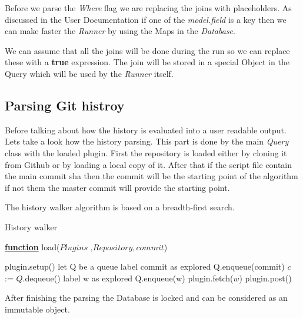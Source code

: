 Before we parse the \textit{Where} flag we are replacing the joins with placeholders.
As discussed in the User Documentation if one of the \textit{model.field} is a key then
we can make faster the \textit{Runner} by using the Maps in the \textit{Database}.

We can assume that all the joins will be done during the run so we can replace these with a
\textbf{true} expression. The join will be stored in a special Object in the Query which will
be used by the \textit{Runner} itself.

\subsection{Parsing Git histroy}

Before talking about how the history is evaluated into a user readable output. Lets take a look
how the history parsing. This part is done by the main \textit{Query} class with the loaded
plugin. First the repository is loaded either by cloning it from Github or by loading a local copy of it. After that if the script file contain the main commit sha then the commit will be the starting point of the algorithm if not them the master commit will provide the starting point.

The history walker algorithm is based on a breadth-first search.

\begin{algorithm}[H]
	\caption{History walker} 
	\label{alg:ibb} 
	\textbf{\underline{function}} load($Plugins$ ,$Repository, commit$)
	\begin{algorithmic}[1] %
		\State plugin.setup()
		\EndFor
		\State let Q be a queue
		\State label commit as explored
		\State Q.enqueue(commit)
		\State $c$ := $Q$.dequeue()
		\State label w as explored  
		\State Q.enqueue(w) 
		\State plugin.fetch($w$)
		\EndFor 
		\EndIf
		\EndFor
		\EndWhile
		\State plugin.post()
		\EndFor
		\end{algorithmic}
\end{algorithm}

After finishing the parsing the Database is locked and can be considered as an immutable object. 

\newpage

